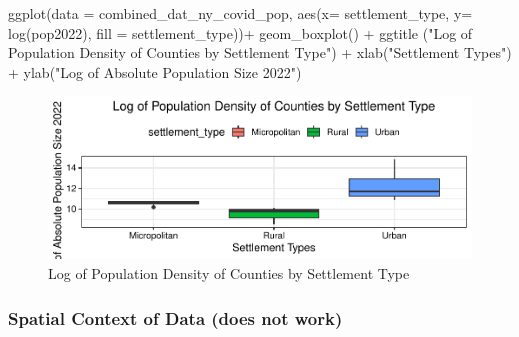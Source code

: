 \documentclass[
  12pt,
]{article}
\newenvironment{Shaded}{\begin{snugshade}}{\end{snugshade}}
\newcommand{\AttributeTok}[1]{\textcolor[rgb]{0.77,0.63,0.00}{#1}}
\newcommand{\FunctionTok}[1]{\textcolor[rgb]{0.00,0.00,0.00}{#1}}
\newcommand{\NormalTok}[1]{#1}
\newcommand{\SpecialCharTok}[1]{\textcolor[rgb]{0.00,0.00,0.00}{#1}}
\newcommand{\StringTok}[1]{\textcolor[rgb]{0.31,0.60,0.02}{#1}}
\begin{document}
\begin{Shaded}
\begin{Highlighting}[]
\FunctionTok{ggplot}\NormalTok{(}\AttributeTok{data =}\NormalTok{ combined\_dat\_ny\_covid\_pop, }\FunctionTok{aes}\NormalTok{(}\AttributeTok{x=}\NormalTok{ settlement\_type, }\AttributeTok{y=} \FunctionTok{log}\NormalTok{(pop2022), }\AttributeTok{fill =}\NormalTok{ settlement\_type))}\SpecialCharTok{+}
  \FunctionTok{geom\_boxplot}\NormalTok{() }\SpecialCharTok{+}
    \FunctionTok{ggtitle}\NormalTok{ (}\StringTok{"Log of Population Density of Counties by Settlement Type"}\NormalTok{) }\SpecialCharTok{+}
  \FunctionTok{xlab}\NormalTok{(}\StringTok{"Settlement Types"}\NormalTok{) }\SpecialCharTok{+}
  \FunctionTok{ylab}\NormalTok{(}\StringTok{"Log of Absolute Population Size 2022"}\NormalTok{)}
\end{Highlighting}
\end{Shaded}

\begin{figure}

\includegraphics{EDA_Final_Group_Project_files/figure-latex/unnamed-chunk-13-1} \hfill{}

\caption{Log of Population Density of Counties by Settlement Type}\label{fig:unnamed-chunk-13}
\end{figure}

\hypertarget{spatial-context-of-data-does-not-work}{%
\subsubsection{Spatial Context of Data (does not
work)}\label{spatial-context-of-data-does-not-work}}
\end{document}
